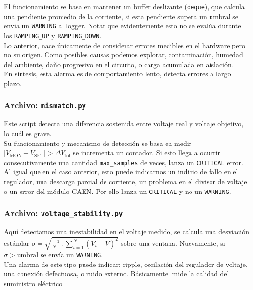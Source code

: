 \documentclass{article}
\begin{document}
El funcionamiento se basa en mantener un buffer deslizante (\texttt{deque}), que calcula una pendiente promedio de la corriente, si esta pendiente supera un umbral se envía un \texttt{WARNING} al logger. Notar que evidentemente esto no se evalúa durante los \texttt{RAMPING\_UP} y \texttt{RAMPING\_DOWN}. \\

Lo anterior, nace únicamente de considerar errores medibles en el hardware pero no su origen. Como posibles causas podemos explorar, contaminación, humedad del ambiente, daño progresivo en el circuito, o carga acumulada en aislación.\\ 

En síntesis, esta alarma es de comportamiento lento, detecta errores a largo plazo. \\

\subsubsection{Archivo: \texttt{mismatch.py}}

Este script detecta una diferencia sostenida entre voltaje real y voltaje objetivo, lo cuál es grave. \\

Su funcionamiento y mecanismo de detección se basa en medir $\left| V_{\text{MON}} - V_{\text{SET}} \right| > \Delta V_{\text{tol}}
$ se incrementa un contador. Si esto llega a ocurrir consecutivamente una cantidad \texttt{max\_samples} de veces, lanza un \texttt{CRITICAL} error. \\

Al igual que en el caso anterior, esto puede indicarnos un indicio de fallo en el regulador, una descarga parcial de corriente, un problema en el divisor de voltaje o un error del módulo CAEN. Por ello lanza un \texttt{CRITICAL} y no un \texttt{WARNING}. \\

\subsubsection{Archivo: \texttt{voltage\_stability.py}}

Aquí detectamos una inestabilidad en el voltaje medido, se calcula una desviación estándar $\sigma = \sqrt{\frac{1}{N-1}\sum_{i=1}^{N} (V_i - \bar V)^2}
$ sobre una ventana. Nuevamente, si $\sigma > \text{umbral}$ se envía un \texttt{WARNING}.\\

Una alarma de este tipo puede indicar; ripple, oscilación del regulador de voltaje, una conexión defectuosa, o ruido externo. Básicamente, mide la calidad del suministro eléctrico.\\
\end{document}
